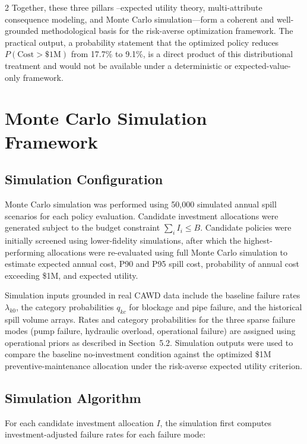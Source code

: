 \documentclass[10pt]{article}
\begin{document}
\begin{multicols}{2}
Together, these three pillars --expected utility theory,
multi-attribute consequence modeling, and Monte Carlo
simulation---form a coherent and well-grounded methodological basis
for the risk-averse optimization framework. The practical output, a
probability statement that the optimized policy reduces
$P(\text{Cost} > \$1\text{M})$ from 17.7\% to 9.1\%, is a direct
product of this distributional treatment and would not be available
under a deterministic or expected-value-only framework.
\section{Monte Carlo Simulation Framework}
\subsection{Simulation Configuration}

Monte Carlo simulation was performed using 50,000 simulated annual spill scenarios for each policy evaluation. Candidate investment allocations were generated subject to the budget constraint $\sum_i I_i \le B$. Candidate policies were initially screened using lower-fidelity simulations, after which the highest-performing allocations were re-evaluated using full Monte Carlo simulation to estimate expected annual cost, P90 and P95 spill cost, probability of
annual cost exceeding \$1M, and expected utility.

Simulation inputs grounded in real CAWD data include the baseline
failure rates $\lambda_{k0}$, the category probabilities $q_{kc}$
for blockage and pipe failure, and the historical spill volume
arrays. Rates and category probabilities for the three sparse
failure modes (pump failure, hydraulic overload, operational
failure) are assigned using operational priors as described in
Section~5.2. Simulation outputs were used to compare the baseline
no-investment condition against the optimized \$1M
preventive-maintenance allocation under the risk-averse expected
utility criterion.

\subsection{Simulation Algorithm}

For each candidate investment allocation $I$, the simulation first
computes investment-adjusted failure rates for each failure mode:


\end{multicols}
\end{document}
